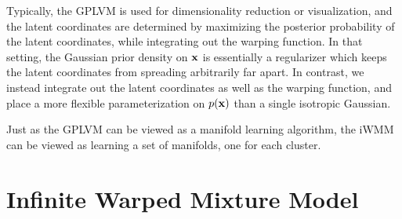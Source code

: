 Typically, the GPLVM is used for dimensionality reduction or visualization, and the latent coordinates are determined by maximizing the posterior probability of the latent coordinates, while integrating out the warping function.  
In that setting, the Gaussian prior density on ${\bf{x}}$ is essentially a regularizer which keeps the latent coordinates from spreading arbitrarily far apart.  
In contrast, we instead integrate out the latent coordinates as well as the warping function, and place a more flexible parameterization on $p({\bf{x}})$ than a single isotropic Gaussian.

Just as the GPLVM can be viewed as a manifold learning algorithm, the iWMM can be viewed as learning a set of manifolds, one for each cluster.





\section{Infinite Warped Mixture Model}

